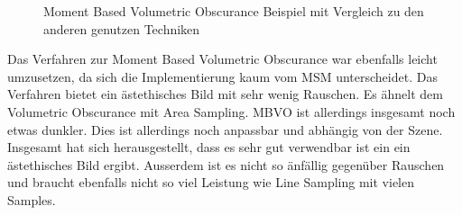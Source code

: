 \documentclass[runningheaders,a4paper]{llncs}
\begin{document}
\begin{figure}[H]
	\caption{Moment Based Volumetric Obscurance Beispiel mit Vergleich zu den anderen genutzen Techniken}
\end{figure}

Das Verfahren zur Moment Based Volumetric Obscurance war ebenfalls leicht umzusetzen, da sich die Implementierung kaum vom MSM unterscheidet. Das Verfahren bietet ein ästethisches Bild mit sehr wenig Rauschen. Es ähnelt dem Volumetric Obscurance mit Area Sampling.
MBVO ist allerdings insgesamt noch etwas dunkler. Dies ist allerdings noch anpassbar und abhängig von der Szene. Insgesamt hat sich herausgestellt, dass es sehr gut verwendbar ist ein ein ästethisches Bild ergibt. Ausserdem ist es nicht so änfällig gegenüber Rauschen und braucht ebenfalls nicht so viel Leistung wie Line Sampling mit vielen Samples.



\end{document}
